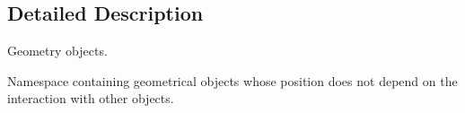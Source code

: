 \subsection{Detailed Description}
Geometry objects. 

Namespace containing geometrical objects whose position does not depend on the interaction with other objects. 